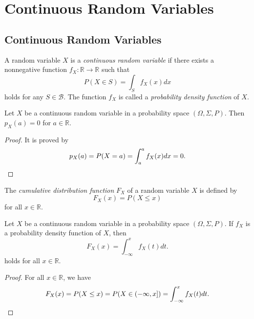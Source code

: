 \chapter{Continuous Random Variables}
\section{Continuous Random Variables}
\begin{definition}
  A random variable $X$ is a \emph{continuous random variable}
  if there exists a nonnegative function $f_X: \mathbb{R} \to \mathbb{R}$
  such that
  \begin{equation*}
    P(X \in S) = \int_S f_X(x) dx
  \end{equation*}
  holds for any $S \in \mathcal{B}$.
  The function $f_X$ is called a \emph{probability density function} of $X$.
\end{definition}

\begin{theorem}
  Let $X$ be a continuous random variable in a probability space
  $(\Omega, \Sigma, P)$.
  Then $p_X(a) = 0$ for $a \in \mathbb{R}$.
\end{theorem}
\begin{proof}
  It is proved by
  \begin{equation*}
    p_X(a) = P(X = a) = \int_a^a f_X(x)dx = 0. \qedhere
  \end{equation*}
\end{proof}

\begin{definition}
  The \emph{cumulative distribution function} $F_X$ of a random variable $X$
  is defined by
  \begin{equation*}
    F_X(x) = P(X \leq x)
  \end{equation*}
  for all $x \in \mathbb{R}$.
\end{definition}

\begin{theorem}
  Let $X$ be a continuous random variable in a probability space
  $(\Omega, \Sigma, P)$.
  If $f_X$ is a probability density function of $X$, then
  \begin{equation*}
    F_X(x) = \int_{-\infty}^x f_X(t) dt.
  \end{equation*}
  holds for all $x \in \mathbb{R}$.
\end{theorem}
\begin{proof}
  For all $x \in \mathbb{R}$, we have
  \begin{equation*}
    F_X(x) = P(X \leq x)
           = P(X \in (-\infty, x])
           = \int_{-\infty}^x f_X(t) dt. \qedhere
  \end{equation*}
\end{proof}